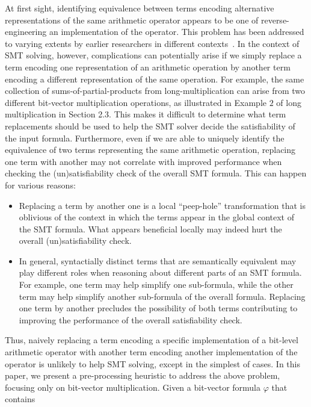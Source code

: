 At first sight, identifying equivalence between terms encoding
alternative representations of the same arithmetic operator appears to
be one of reverse-engineering an implementation of the operator.  This
problem has been addressed to varying extents by earlier researchers
in different contexts~\cite{reveng,earlier-pat-match-synopsys}.  In the
context of SMT solving, however, complications can potentially arise
if we simply replace a term encoding one representation of an
arithmetic operation by another term encoding a different
representation of the same operation. For example, the same collection
of sums-of-partial-products from long-multiplication can arise from
two different bit-vector multiplication operations, as illustrated in
Example $2$ of long multiplication in Section 2.3.  This makes it
difficult to determine what term replacements should be used to help
the SMT solver decide the satisfiability of the input formula.
Furthermore, even if we are able to uniquely identify the equivalence
of two terms representing the same arithmetic operation, replacing one
term with another may not correlate with improved performance when
checking the (un)satisfiability check of the overall SMT formula.
This can happen for various reasons:
\begin{itemize}
\item Replacing a term by another one is a local ``peep-hole'' transformation
      that is oblivious of the context in which the terms appear in
      the global context of the SMT formula.  What appears beneficial
      locally may indeed hurt the overall (un)satisfiability check.
\item In general, syntactially distinct terms that are semantically equivalent
      may play different roles when reasoning about different parts of
  an SMT formula.  For example, one term may help simplify one sub-formula,
  while the other term may help simplify another sub-formula of the overall
  formula. Replacing one term by another precludes the possibility of both
  terms contributing to improving the performance of the overall satisfiability
  check.
\end{itemize}
Thus, naively replacing a term encoding a specific implementation of a
bit-level arithmetic operator with another term encoding another
implementation of the operator is unlikely to help SMT solving, except
in the simplest of cases.  In this paper, we present a pre-processing
heuristic to address the above problem, focusing only on bit-vector
multiplication.  Given a bit-vector formula $\varphi$ that contains
